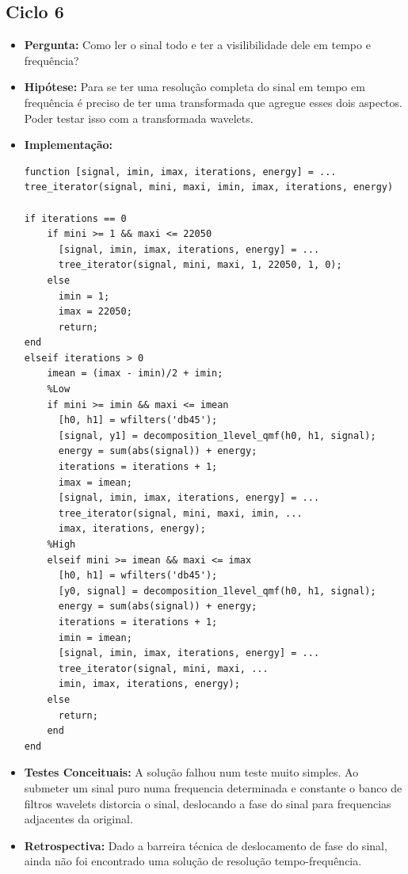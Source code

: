 \subsection{Ciclo 6}
\label{subsec:ciclo_6}
\begin{itemize}
\item \textbf{Pergunta:} Como ler o sinal todo e ter a visilibilidade dele em tempo e frequência?
\item \textbf{Hipótese:} Para se ter uma resolução completa do sinal em tempo em frequência é preciso de ter uma transformada que agregue esses dois aspectos. Poder testar isso com a transformada wavelets.   
\item \textbf{Implementação:} 
\begin{lstlisting}
function [signal, imin, imax, iterations, energy] = ...
tree_iterator(signal, mini, maxi, imin, imax, iterations, energy)

if iterations == 0
	if mini >= 1 && maxi <= 22050
	  [signal, imin, imax, iterations, energy] = ...
	  tree_iterator(signal, mini, maxi, 1, 22050, 1, 0);
	else
	  imin = 1;
	  imax = 22050;
	  return;
end
elseif iterations > 0
	imean = (imax - imin)/2 + imin;
	%Low
	if mini >= imin && maxi <= imean
	  [h0, h1] = wfilters('db45');
	  [signal, y1] = decomposition_1level_qmf(h0, h1, signal);
	  energy = sum(abs(signal)) + energy;
	  iterations = iterations + 1;
	  imax = imean;
	  [signal, imin, imax, iterations, energy] = ...
	  tree_iterator(signal, mini, maxi, imin, ...
	  imax, iterations, energy);
	%High 
	elseif mini >= imean && maxi <= imax
	  [h0, h1] = wfilters('db45');
	  [y0, signal] = decomposition_1level_qmf(h0, h1, signal);
	  energy = sum(abs(signal)) + energy;
	  iterations = iterations + 1;
	  imin = imean;
	  [signal, imin, imax, iterations, energy] = ...
	  tree_iterator(signal, mini, maxi, ...
	  imin, imax, iterations, energy);
	else
	  return;
	end
end

\end{lstlisting}
\item \textbf{Testes Conceituais:} A solução falhou num teste muito simples. Ao submeter um sinal puro numa frequencia determinada e constante o banco de filtros wavelets distorcia o sinal, deslocando a fase do sinal para frequencias adjacentes da original.
\item \textbf{Retrospectiva:} Dado a barreira técnica de deslocamento de fase do sinal, ainda não foi encontrado uma solução de resolução tempo-frequência.
\end{itemize}

